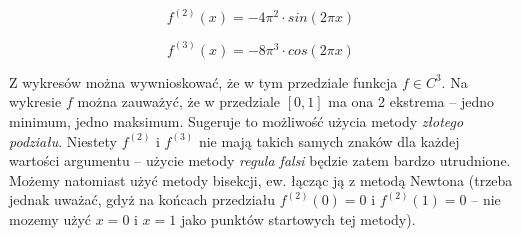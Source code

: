 \documentclass[a4paper,11pt]{article}
\begin{document}
      \begin{center}
      \end{center}
      $$ f^{(2)}(x) = -4 \pi^2 \cdot sin(2 \pi x) $$
      \begin{center}
      \end{center}
      $$ f^{(3)}(x) = -8 \pi^3 \cdot cos(2 \pi x) $$
      
      Z wykresów można wywnioskować, że w tym przedziale funkcja $ f \in C^3 $. Na wykresie $ f $ można zauważyć, że w przedziale $[0,1]$ ma ona 2 ekstrema -- jedno minimum, jedno maksimum. Sugeruje to możliwość użycia metody \emph{złotego podziału}. Niestety $f^{(2)}$ i $f^{(3)}$ nie mają takich samych znaków dla każdej wartości argumentu -- użycie metody \emph{regula falsi} będzie zatem bardzo utrudnione. Możemy natomiast użyć metody bisekcji, ew. łącząc ją z metodą Newtona (trzeba jednak uważać, gdyż na końcach przedziału $f^{(2)}(0) = 0$ i $f^{(2)}(1) = 0$ -- nie mozemy użyć $ x = 0 $ i $ x = 1 $ jako punktów startowych tej metody). 
      
\end{document}
